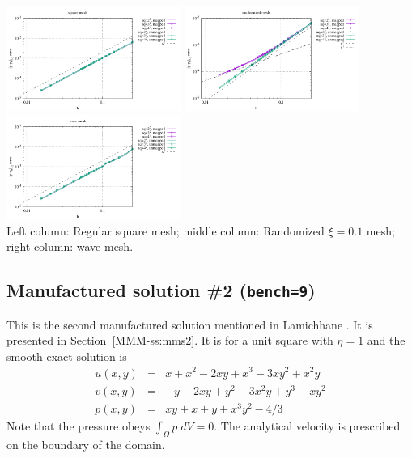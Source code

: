 \begin{center}
\includegraphics[width=5.7cm]{python_codes/fieldstone_76/results/bench1/reg/errors_P}
\includegraphics[width=5.7cm]{python_codes/fieldstone_76/results/bench1/rand/errors_P}
\includegraphics[width=5.7cm]{python_codes/fieldstone_76/results/bench1/wave/errors_P}\\
{\captionfont Left column: Regular square mesh; middle column: Randomized $\xi=0.1$ mesh;
right column: wave mesh.}
\end{center}

\newpage
\subsection*{Manufactured solution \#2 ({\tt bench=9})}

This is the second manufactured solution 
mentioned in Lamichhane \cite{lami17}. It is presented in Section~\ref{MMM-ss:mms2}.
It is for a unit square with $\eta=1$ and the smooth exact solution is
\begin{eqnarray}
u(x,y) &=& x+x^2 - 2xy+x^3 - 3xy^2 + x^2y \\
v(x,y) &=& -y-2xy+y^2 -3x^2y + y^3 - xy^2 \\
p(x,y) &=& xy+x+y+x^3y^2 - 4/3
\end{eqnarray}
Note that the pressure obeys $\int_{\Omega} p \; dV = 0$. The analytical 
velocity is prescribed on the boundary of the domain. 

